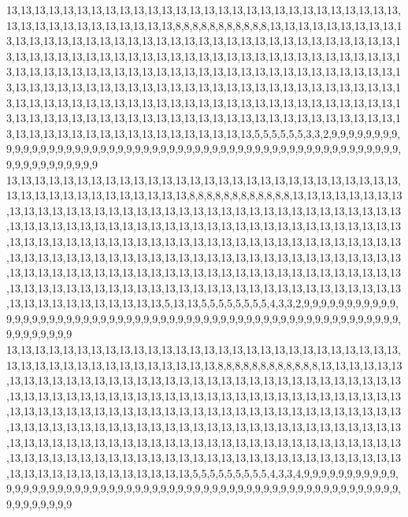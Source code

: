 13,13,13,13,13,13,13,13,13,13,13,13,13,13,13,13,13,13,13,13,13,13,13,13,13,13,13,13,13,13,13,13,13,13,13,13,13,13,13,13,8,8,8,8,8,8,8,8,8,8,8,13,13,13,13,13,13,13,13,13,13,13,13,13,13,13,13,13,13,13,13,13,13,13,13,13,13,13,13,13,13,13,13,13,13,13,13,13,13,13,13,13,13,13,13,13,13,13,13,13,13,13,13,13,13,13,13,13,13,13,13,13,13,13,13,13,13,13,13,13,13,13,13,13,13,13,13,13,13,13,13,13,13,13,13,13,13,13,13,13,13,13,13,13,13,13,13,13,13,13,13,13,13,13,13,13,13,13,13,13,13,13,13,13,13,13,13,13,13,13,13,13,13,13,13,13,13,13,13,13,13,13,13,13,13,13,13,13,13,13,13,13,13,13,13,13,13,13,13,13,13,13,13,13,13,13,13,13,13,13,13,13,13,13,13,13,13,13,13,13,13,13,13,13,13,13,13,13,13,13,13,13,13,13,13,13,13,13,13,13,13,13,13,13,13,13,5,5,5,5,5,5,3,3,2,9,9,9,9,9,9,9,9,9,9,9,9,9,9,9,9,9,9,9,9,9,9,9,9,9,9,9,9,9,9,9,9,9,9,9,9,9,9,9,9,9,9,9,9,9,9,9,9,9,9,9,9,9,9,9,9,9,9,9,9,9,9,9,9,9
13,13,13,13,13,13,13,13,13,13,13,13,13,13,13,13,13,13,13,13,13,13,13,13,13,13,13,13,13,13,13,13,13,13,13,13,13,13,13,13,13,8,8,8,8,8,8,8,8,8,8,8,8,13,13,13,13,13,13,13,13,13,13,13,13,13,13,13,13,13,13,13,13,13,13,13,13,13,13,13,13,13,13,13,13,13,13,13,13,13,13,13,13,13,13,13,13,13,13,13,13,13,13,13,13,13,13,13,13,13,13,13,13,13,13,13,13,13,13,13,13,13,13,13,13,13,13,13,13,13,13,13,13,13,13,13,13,13,13,13,13,13,13,13,13,13,13,13,13,13,13,13,13,13,13,13,13,13,13,13,13,13,13,13,13,13,13,13,13,13,13,13,13,13,13,13,13,13,13,13,13,13,13,13,13,13,13,13,13,13,13,13,13,13,13,13,13,13,13,13,13,13,13,13,13,13,13,13,13,13,13,13,13,13,13,13,13,13,13,13,13,13,13,13,13,13,13,13,13,13,13,13,13,13,13,13,13,13,13,13,5,13,13,5,5,5,5,5,5,5,5,4,3,3,2,9,9,9,9,9,9,9,9,9,9,9,9,9,9,9,9,9,9,9,9,9,9,9,9,9,9,9,9,9,9,9,9,9,9,9,9,9,9,9,9,9,9,9,9,9,9,9,9,9,9,9,9,9,9,9,9,9,9,9,9,9,9,9,9,9
13,13,13,13,13,13,13,13,13,13,13,13,13,13,13,13,13,13,13,13,13,13,13,13,13,13,13,13,13,13,13,13,13,13,13,13,13,13,13,13,13,13,13,8,8,8,8,8,8,8,8,8,8,8,8,13,13,13,13,13,13,13,13,13,13,13,13,13,13,13,13,13,13,13,13,13,13,13,13,13,13,13,13,13,13,13,13,13,13,13,13,13,13,13,13,13,13,13,13,13,13,13,13,13,13,13,13,13,13,13,13,13,13,13,13,13,13,13,13,13,13,13,13,13,13,13,13,13,13,13,13,13,13,13,13,13,13,13,13,13,13,13,13,13,13,13,13,13,13,13,13,13,13,13,13,13,13,13,13,13,13,13,13,13,13,13,13,13,13,13,13,13,13,13,13,13,13,13,13,13,13,13,13,13,13,13,13,13,13,13,13,13,13,13,13,13,13,13,13,13,13,13,13,13,13,13,13,13,13,13,13,13,13,13,13,13,13,13,13,13,13,13,13,13,13,13,13,13,13,13,13,13,13,13,13,13,13,13,13,13,13,13,5,5,5,5,5,5,5,5,5,4,3,3,4,9,9,9,9,9,9,9,9,9,9,9,9,9,9,9,9,9,9,9,9,9,9,9,9,9,9,9,9,9,9,9,9,9,9,9,9,9,9,9,9,9,9,9,9,9,9,9,9,9,9,9,9,9,9,9,9,9,9,9,9,9,9,9,9,9
